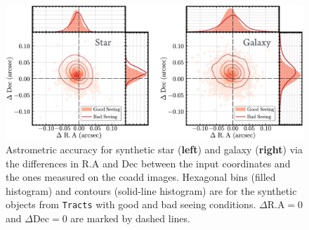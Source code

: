 \documentclass[useamsfonts]{pasj01}
\def\tracts{\texttt{Tracts}}
\begin{document}
\begin{figure}
    \begin{center}
        \includegraphics[width=\textwidth]{fig/synpipe_astrometry}
    \end{center}
    \caption{
        Astrometric accuracy for synthetic star (\textbf{left}) and galaxy 
        (\textbf{right}) via the differences in R.A and Dec between the input
        coordinates and the ones measured on the coadd images. 
        Hexagonal bins (filled histogram) and contours (solid-line histogram) are for 
        the synthetic objects from \tracts{} with good and bad seeing conditions. 
        $\Delta\mathrm{R.A}=0$ and $\Delta\mathrm{Dec}=0$ are marked by dashed lines.
        }
    \label{fig:astrometry}
\end{figure}
\end{document}
